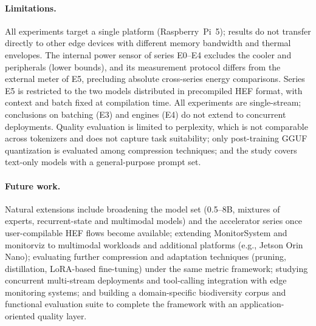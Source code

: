 \documentclass[acmsmall,natbib=false]{acmart}
\begin{document}
\paragraph{Limitations.}
All experiments target a single platform (Raspberry~Pi~5); results do not
transfer directly to other edge devices with different memory bandwidth and
thermal envelopes. The internal power sensor of series E0--E4 excludes the
cooler and peripherals (lower bounds), and its measurement protocol differs
from the external meter of E5, precluding absolute cross-series energy
comparisons. Series E5 is restricted to the two models distributed in
precompiled HEF format, with context and batch fixed at compilation time.
All experiments are single-stream; conclusions on batching (E3) and engines
(E4) do not extend to concurrent deployments. Quality evaluation is limited
to perplexity, which is not comparable across tokenizers and does not
capture task suitability; only post-training GGUF quantization is evaluated
among compression techniques; and the study covers text-only models with a
general-purpose prompt set.

\paragraph{Future work.}
Natural extensions include broadening the model set (0.5--8B, mixtures of
experts, recurrent-state and multimodal models) and the accelerator series
once user-compilable HEF flows become available; extending MonitorSystem and
monitorviz to multimodal workloads and additional platforms (e.g., Jetson
Orin Nano); evaluating further compression and adaptation techniques
(pruning, distillation, LoRA-based fine-tuning) under the same metric
framework; studying concurrent multi-stream deployments and tool-calling
integration with edge monitoring systems; and building a domain-specific
biodiversity corpus and functional evaluation suite to complete the
framework with an application-oriented quality layer.


\printbibliography
\end{document}
